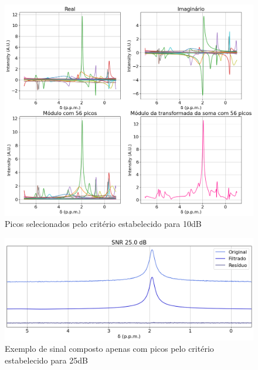 \documentclass[12pt]{article}
\begin{document}
\begin{figure} [H]
    \centering
    \includegraphics[scale=0.5]{real-imag-modulo-10.png}
    \caption{Picos selecionados pelo critério estabelecido para 10dB}
    \label{fig:14}
\end{figure}

\begin{figure} [H]
    \centering
    \includegraphics[scale=0.5]{original-filtrado-residuo-25.png}
    \caption{Exemplo de sinal composto apenas com picos pelo critério estabelecido para 25dB}
    \label{fig:15}
\end{figure}
\end{document}
